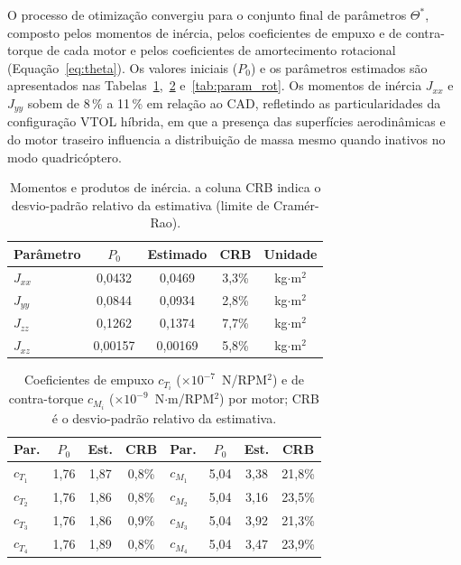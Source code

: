 \documentclass[letterpaper, 10 pt, conference]{ieeeconf}
\begin{document}
O processo de otimização convergiu para o conjunto final de parâmetros $\Theta^*$, composto pelos momentos de inércia, pelos coeficientes de empuxo e de contra-torque de cada motor e pelos coeficientes de amortecimento rotacional (Equação~\eqref{eq:theta}). Os valores iniciais ($P_0$) e os parâmetros estimados são apresentados nas Tabelas~\ref{tab:param_inercia},~\ref{tab:param_motor} e~\ref{tab:param_rot}. Os momentos de inércia $J_{xx}$ e $J_{yy}$ sobem de 8\,\% a 11\,\% em relação ao CAD, refletindo as particularidades da configuração VTOL híbrida, em que a presença das superfícies aerodinâmicas e do motor traseiro influencia a distribuição de massa mesmo quando inativos no modo quadricóptero.

\begin{table}[htbp]
\centering
\begin{tabular}{l|c|c|c|c}
\hline
\textbf{Par\^ametro} & \textbf{$P_0$} & \textbf{Estimado} & \textbf{CRB} & \textbf{Unidade} \\
\hline
$J_{xx}$ & 0,0432 & 0,0469 & 3,3\% & kg$\cdot$m$^2$ \\
$J_{yy}$ & 0,0844 & 0,0934 & 2,8\% & kg$\cdot$m$^2$ \\
$J_{zz}$ & 0,1262 & 0,1374 & 7,7\% & kg$\cdot$m$^2$ \\
$J_{xz}$ & 0,00157 & 0,00169 & 5,8\% & kg$\cdot$m$^2$ \\
\hline
\end{tabular}
\caption{Momentos e produtos de inércia. a coluna CRB indica o desvio-padr\~ao relativo da estimativa (limite de Cramér-Rao).}
\label{tab:param_inercia}
\end{table}

\begin{table}[htbp]
\centering
\setlength{\tabcolsep}{4pt}
\begin{tabular}{l|c|c|c||l|c|c|c}
\hline
\textbf{Par.} & \textbf{$P_0$} & \textbf{Est.} & \textbf{CRB} & \textbf{Par.} & \textbf{$P_0$} & \textbf{Est.} & \textbf{CRB} \\
\hline
$c_{T_1}$ & 1,76 & 1,87 & 0,8\% & $c_{M_1}$ & 5,04 & 3,38 & 21,8\% \\
$c_{T_2}$ & 1,76 & 1,86 & 0,8\% & $c_{M_2}$ & 5,04 & 3,16 & 23,5\% \\
$c_{T_3}$ & 1,76 & 1,86 & 0,9\% & $c_{M_3}$ & 5,04 & 3,92 & 21,3\% \\
$c_{T_4}$ & 1,76 & 1,89 & 0,8\% & $c_{M_4}$ & 5,04 & 3,47 & 23,9\% \\
\hline
\end{tabular}
\caption{Coeficientes de empuxo $c_{T_i}$ ($\times 10^{-7}$~N/RPM$^2$) e de contra-torque $c_{M_i}$ ($\times 10^{-9}$~N$\cdot$m/RPM$^2$) por motor; CRB \'e o desvio-padr\~ao relativo da estimativa.}
\label{tab:param_motor}
\end{table}
\end{document}
